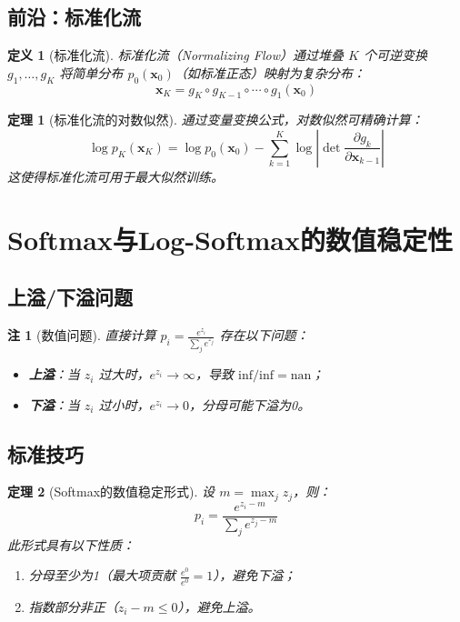\documentclass[UTF8, 10pt]{ctexart}
\newtheorem{theorem}{定理}[section]
\newtheorem{definition}{定义}[section]
\newtheorem{remark}{注}[section]
\begin{document}
\subsection{前沿：标准化流}
\begin{definition}[标准化流]
标准化流（Normalizing Flow）通过堆叠 $K$ 个可逆变换 $g_1, \ldots, g_K$ 将简单分布 $p_0(\bm{x}_0)$（如标准正态）映射为复杂分布：
\[
\bm{x}_K = g_K \circ g_{K-1} \circ \cdots \circ g_1(\bm{x}_0)
\]
\end{definition}

\begin{theorem}[标准化流的对数似然]
通过变量变换公式，对数似然可精确计算：
\[
\log p_K(\bm{x}_K) = \log p_0(\bm{x}_0) - \sum_{k=1}^{K} \log\left|\det \frac{\partial g_k}{\partial \bm{x}_{k-1}}\right|
\]
这使得标准化流可用于最大似然训练。
\end{theorem}

\section{Softmax与Log-Softmax的数值稳定性}
\subsection{上溢/下溢问题}
\begin{remark}[数值问题]
直接计算 $p_i = \frac{e^{z_i}}{\sum_j e^{z_j}}$ 存在以下问题：
\begin{itemize}
    \item \textbf{上溢}：当 $z_i$ 过大时，$e^{z_i} \to \infty$，导致 $\text{inf}/\text{inf} = \text{nan}$；
    \item \textbf{下溢}：当 $z_i$ 过小时，$e^{z_i} \to 0$，分母可能下溢为0。
\end{itemize}
\end{remark}

\subsection{标准技巧}
\begin{theorem}[Softmax的数值稳定形式]
设 $m = \max_j z_j$，则：
\[
p_i = \frac{e^{z_i - m}}{\sum_j e^{z_j - m}}
\]
此形式具有以下性质：
\begin{enumerate}
    \item 分母至少为1（最大项贡献 $\frac{e^0}{e^0} = 1$），避免下溢；
    \item 指数部分非正（$z_i - m \le 0$），避免上溢。
\end{enumerate}
\end{theorem}
\end{document}

